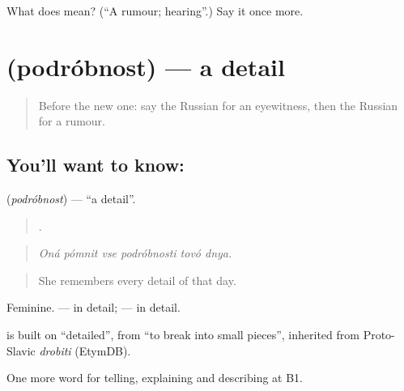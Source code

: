 \begin{tcolorbox}[breakable,colback=teal!4,colframe=teal!35!black,title={Before you move on}]
What does  mean? (\textquotedblleft{}A rumour; hearing\textquotedblright{}.) Say it once more.
\end{tcolorbox}
\section[\texorpdfstring{\ru{подробность} (podróbnost)}{подробность (podróbnost)}]{ (podróbnost) — a detail}

\label{lesson:RU-C282-podrobnost}



\begin{quote}
Before the new one: say the Russian for an eyewitness, then the Russian for a rumour.
\end{quote}

\subsection*{You'll want to know: }
\textbf{} (\emph{podróbnost}) — \textquotedblleft{}a detail\textquotedblright{}.

\begin{quote}
     .
\end{quote}

\begin{quote}
\emph{Oná pómnit vse podróbnosti tovó dnya.}
\end{quote}

\begin{quote}
She remembers every detail of that day.
\end{quote}

Feminine. \emph{ } — in detail; \emph{} — in detail.

\begin{cousinweb}
\emph{} is built on \emph{} \textquotedblleft{}detailed\textquotedblright{}, from \emph{} \textquotedblleft{}to break into small pieces\textquotedblright{}, inherited from Proto-Slavic \emph{drobiti} (EtymDB).
\end{cousinweb}

\begin{grammarlens}[title={What you've built}]
One more word for telling, explaining and describing at B1.
\end{grammarlens}

